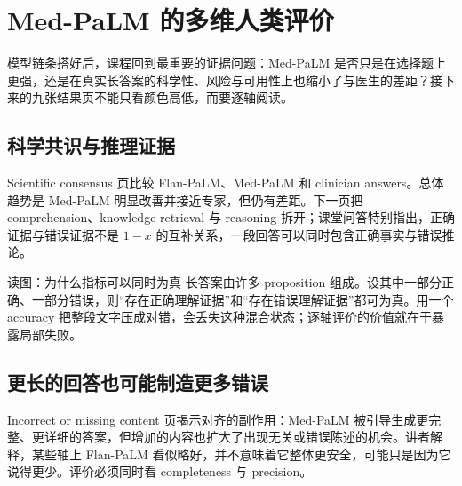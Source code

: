 \section{Med-PaLM 的多维人类评价}

模型链条搭好后，课程回到最重要的证据问题：Med-PaLM 是否只是在选择题上更强，还是在真实长答案的科学性、风险与可用性上也缩小了与医生的差距？接下来的九张结果页不能只看颜色高低，而要逐轴阅读。

\subsection{科学共识与推理证据}

Scientific consensus 页比较 Flan-PaLM、Med-PaLM 和 clinician answers。总体趋势是 Med-PaLM 明显改善并接近专家，但仍有差距。下一页把 comprehension、knowledge retrieval 与 reasoning 拆开；课堂问答特别指出，正确证据与错误证据不是 $1-x$ 的互补关系，一段回答可以同时包含正确事实与错误推论。




\begin{knowledgebox}{读图：为什么指标可以同时为真}
长答案由许多 proposition 组成。设其中一部分正确、一部分错误，则“存在正确理解证据”和“存在错误理解证据”都可为真。用一个 accuracy 把整段文字压成对错，会丢失这种混合状态；逐轴评价的价值就在于暴露局部失败。
\end{knowledgebox}

\subsection{更长的回答也可能制造更多错误}

Incorrect or missing content 页揭示对齐的副作用：Med-PaLM 被引导生成更完整、更详细的答案，但增加的内容也扩大了出现无关或错误陈述的机会。讲者解释，某些轴上 Flan-PaLM 看似略好，并不意味着它整体更安全，可能只是因为它说得更少。评价必须同时看 completeness 与 precision。


